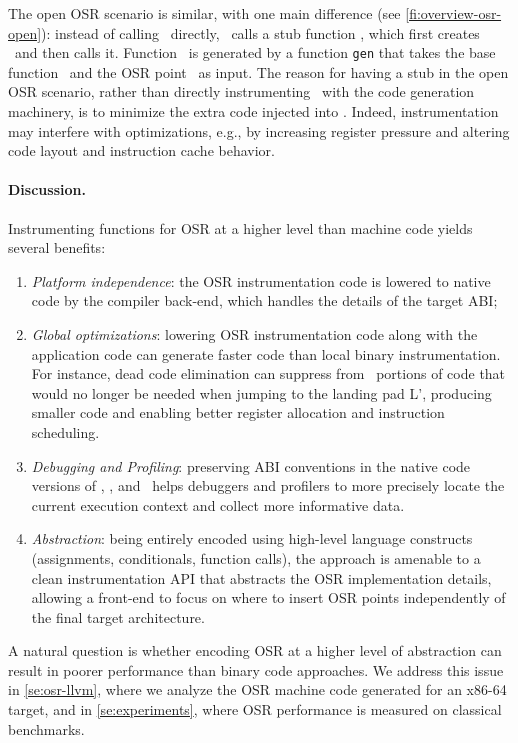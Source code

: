 The open OSR scenario is similar, with one main difference (see \myfigure\ref{fi:overview-osr-open}): instead of calling \fosrto\ directly, \fosrfrom\ calls a stub function \fstub, which first creates \fosrto\ and then calls it. Function \fosrto\ is generated by a function {\tt gen} that takes the base function \fbase\ and the OSR point \osrpoint\ as input. The reason for having a stub in the open OSR scenario, rather than directly instrumenting \fbase\ with the code generation machinery, is to minimize the extra code injected into \fbase. Indeed, instrumentation may interfere with optimizations, e.g., by increasing register pressure and altering code layout and instruction cache behavior.


\paragraph{Discussion.}
Instrumenting functions for OSR at a higher level than machine code yields several benefits: 
\begin{enumerate}
\item {\em Platform independence}: the OSR instrumentation code is lowered to native code by the compiler back-end, which handles the details of the target ABI; 
\item {\em Global optimizations}: lowering OSR instrumentation code along with the application code can generate faster code than local binary instrumentation. For instance, dead code elimination can suppress from \fosrto\ portions of code that would no longer be needed when jumping to the landing pad \textsf{L'}, producing smaller code and enabling better register allocation and instruction scheduling.
\item {\em Debugging and Profiling}: preserving ABI conventions in the native code versions of \fosrfrom, \fstub, and \fosrto\ helps debuggers and profilers to more precisely locate the current execution context and collect more informative data.
\item {\em Abstraction}: being entirely encoded using high-level language constructs (assignments, conditionals, function calls), the approach is amenable to a clean instrumentation API that abstracts the OSR implementation details, allowing a front-end to focus on where to insert OSR points independently of the final target architecture.
\end{enumerate}

\noindent A natural question is whether encoding OSR at a higher level of abstraction can result in poorer performance than binary code approaches. We address this issue in \mysection\ref{se:osr-llvm}, where we analyze the OSR machine code generated for an x86-64 target, and in \mysection\ref{se:experiments}, where OSR performance is measured on classical benchmarks.
